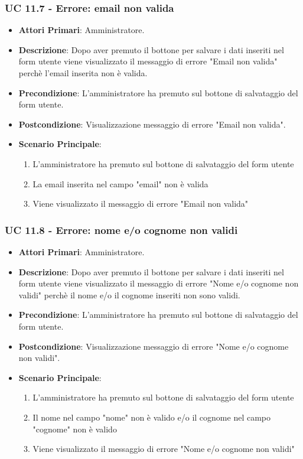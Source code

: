 			\subsubsection{UC 11.7 - Errore: email non valida}
			\begin{itemize}
				\item \textbf{Attori Primari}: Amministratore.
				\item \textbf{Descrizione}: Dopo aver premuto il bottone per salvare i dati inseriti nel form utente viene visualizzato il messaggio di errore "Email non valida" perchè l'email inserita non è valida. 
				\item \textbf{Precondizione}: L'amministratore ha premuto sul bottone di salvataggio del form utente.
				\item \textbf{Postcondizione}: Visualizzazione messaggio di errore "Email non valida".
				\item \textbf{Scenario Principale}:
				\begin{enumerate}
					\item{L'amministratore ha premuto sul bottone di salvataggio del form utente}
					\item{La email inserita nel campo "email" non è valida}
					\item{Viene visualizzato il messaggio di errore "Email non valida"}
				\end{enumerate}	
			\end{itemize}
			
			\subsubsection{UC 11.8 - Errore: nome e/o cognome non validi}
			\begin{itemize}
				\item \textbf{Attori Primari}: Amministratore.
				\item \textbf{Descrizione}: Dopo aver premuto il bottone per salvare i dati inseriti nel form utente viene visualizzato il messaggio di errore "Nome e/o cognome non validi" perchè il nome e/o il cognome inseriti non sono validi. 
				\item \textbf{Precondizione}: L'amministratore ha premuto sul bottone di salvataggio del form utente.
				\item \textbf{Postcondizione}: Visualizzazione messaggio di errore "Nome e/o cognome non validi".
				\item \textbf{Scenario Principale}:
				\begin{enumerate}
					\item{L'amministratore ha premuto sul bottone di salvataggio del form utente}
					\item{Il nome nel campo "nome" non è valido e/o il cognome nel campo "cognome" non è valido}
					\item{Viene visualizzato il messaggio di errore "Nome e/o cognome non validi"}
				\end{enumerate}	
			\end{itemize}
			

			
			
			